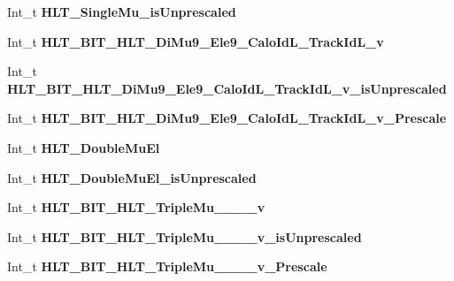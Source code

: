 \begin{DoxyCompactItemize}
\hypertarget{classMiniTree_afaad548e5586ec75bded921fd065dc33}{}\label{classMiniTree_afaad548e5586ec75bded921fd065dc33} 
Int\+\_\+t {\bfseries H\+L\+T\+\_\+\+Single\+Mu\+\_\+is\+Unprescaled}
\item 
\hypertarget{classMiniTree_ab02eafb76b6bbc605ed1f6707b30c67c}{}\label{classMiniTree_ab02eafb76b6bbc605ed1f6707b30c67c} 
Int\+\_\+t {\bfseries H\+L\+T\+\_\+\+B\+I\+T\+\_\+\+H\+L\+T\+\_\+\+Di\+Mu9\+\_\+\+Ele9\+\_\+\+Calo\+Id\+L\+\_\+\+Track\+Id\+L\+\_\+v}
\item 
\hypertarget{classMiniTree_a06f7df87f1fa1f54c955fcc7e0827cda}{}\label{classMiniTree_a06f7df87f1fa1f54c955fcc7e0827cda} 
Int\+\_\+t {\bfseries H\+L\+T\+\_\+\+B\+I\+T\+\_\+\+H\+L\+T\+\_\+\+Di\+Mu9\+\_\+\+Ele9\+\_\+\+Calo\+Id\+L\+\_\+\+Track\+Id\+L\+\_\+v\+\_\+is\+Unprescaled}
\item 
\hypertarget{classMiniTree_a2359c663be4af9edd5b51109d4bd7222}{}\label{classMiniTree_a2359c663be4af9edd5b51109d4bd7222} 
Int\+\_\+t {\bfseries H\+L\+T\+\_\+\+B\+I\+T\+\_\+\+H\+L\+T\+\_\+\+Di\+Mu9\+\_\+\+Ele9\+\_\+\+Calo\+Id\+L\+\_\+\+Track\+Id\+L\+\_\+v\+\_\+\+Prescale}
\item 
\hypertarget{classMiniTree_a15c5ec61271937a49e2f85782b3b0f92}{}\label{classMiniTree_a15c5ec61271937a49e2f85782b3b0f92} 
Int\+\_\+t {\bfseries H\+L\+T\+\_\+\+Double\+Mu\+El}
\item 
\hypertarget{classMiniTree_ad54b62ca7c98513cb7a20b1355747515}{}\label{classMiniTree_ad54b62ca7c98513cb7a20b1355747515} 
Int\+\_\+t {\bfseries H\+L\+T\+\_\+\+Double\+Mu\+El\+\_\+is\+Unprescaled}
\item 
\hypertarget{classMiniTree_a02e34f972f31d1f0793c5eeb755357ba}{}\label{classMiniTree_a02e34f972f31d1f0793c5eeb755357ba} 
Int\+\_\+t {\bfseries H\+L\+T\+\_\+\+B\+I\+T\+\_\+\+H\+L\+T\+\_\+\+Triple\+Mu\+\_\+\_\+\_\+\_\+v}
\item 
\hypertarget{classMiniTree_a7efe93e9227099f34e4be3852861ebb7}{}\label{classMiniTree_a7efe93e9227099f34e4be3852861ebb7} 
Int\+\_\+t {\bfseries H\+L\+T\+\_\+\+B\+I\+T\+\_\+\+H\+L\+T\+\_\+\+Triple\+Mu\+\_\+\_\+\_\+\_\+v\+\_\+is\+Unprescaled}
\item 
\hypertarget{classMiniTree_a7364a77a86673ca779cc5c56ab86d200}{}\label{classMiniTree_a7364a77a86673ca779cc5c56ab86d200} 
Int\+\_\+t {\bfseries H\+L\+T\+\_\+\+B\+I\+T\+\_\+\+H\+L\+T\+\_\+\+Triple\+Mu\+\_\+\_\+\_\+\_\+v\+\_\+\+Prescale}
\item 
\hypertarget{classMiniTree_a3942a3f139e2ce35c004644b69311df8}{}\label{classMiniTree_a3942a3f139e2ce35c004644b69311df8} 

\end{DoxyCompactItemize}
